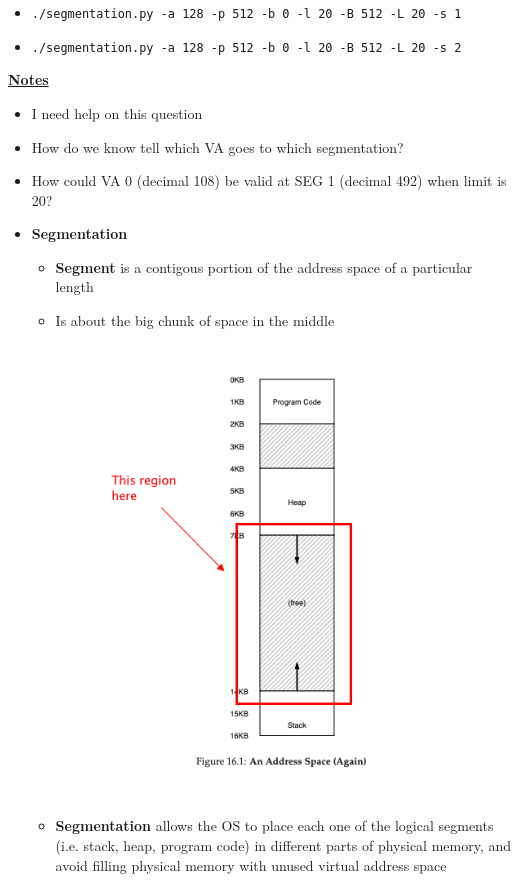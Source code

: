 \documentclass[12pt]{article}
\begin{document}
\begin{enumerate}[1.]
\begin{itemize}
        \item \texttt{./segmentation.py -a 128 -p 512 -b 0 -l 20 -B 512 -L 20 -s 1}
        \item \texttt{./segmentation.py -a 128 -p 512 -b 0 -l 20 -B 512 -L 20 -s 2}
    \end{itemize}


    \bigskip

    \underline{\textbf{Notes}}

    \begin{itemize}
        \item I need help on this question
        \item How do we know tell which VA goes to which segmentation?
        \item How could VA 0 (decimal 108) be valid at SEG 1 (decimal 492) when limit is 20?
        \item \textbf{Segmentation}

        \begin{itemize}
            \item \textbf{Segment} is a contigous portion of the address space of a particular length
            \item Is about the big chunk of space in the middle

            \begin{center}
            \includegraphics[width=0.7\linewidth]{images/worksheet_8_solution_1.png}
            \end{center}

            \item \textbf{Segmentation} allows the OS to place each one of the logical segments (i.e. stack, heap, program code)
            in different parts of physical memory, and avoid filling physical memory with unused virtual address space



\end{itemize}
\end{itemize}
\end{enumerate}
\end{document}
